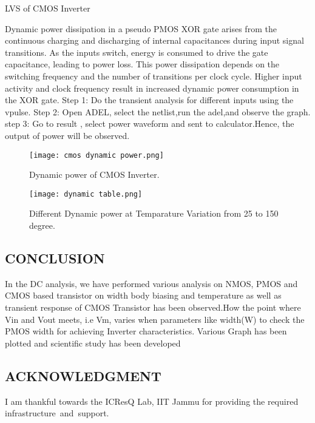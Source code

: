 \documentclass[conference]{IEEEtran}
\begin{document}
\begin{section}{LVS of CMOS Inverter}
\begin{Dynamic Power Analysis}
Dynamic power dissipation in a pseudo PMOS XOR gate
arises from the continuous charging and discharging of internal
capacitances during input signal transitions. As the inputs
switch, energy is consumed to drive the gate capacitance,
leading to power loss.
This power dissipation depends on the switching frequency
and the number of transitions per clock cycle. Higher input
activity and clock frequency result in increased dynamic power
consumption in the XOR gate.
Step 1: Do the transient analysis for different inputs using
the vpulse.
Step 2: Open ADEL, select the netlist,run the adel,and observe
the graph.
step 3: Go to result , select power waveform and sent to
calculator.Hence, the output of power will be observed.
 
\begin{figure}[h] %
    \centering
    \texttt{[image: cmos dynamic power.png]} %
    \caption{Dynamic power of CMOS Inverter.} %
     
\end{figure} 
 
 
\begin{figure}[h] %
    \centering
    \texttt{[image: dynamic table.png]} %
    \caption{Different Dynamic power at Temparature Variation from 25 to 150 degree.} %
     
\end{figure}  
 
 
 
 
 
 
 \section{CONCLUSION} 
In the  DC analysis, we have performed various analysis on NMOS, PMOS and CMOS based transistor on width body biasing and temperature as well as transient response of CMOS Transistor has been observed.How the point where Vin and Vout meets, i.e Vm, varies when parameters like width(W) to check the PMOS width for achieving Inverter characteristics. Various Graph has been plotted and scientific study has been developed
\section{ACKNOWLEDGMENT}
I am thankful towards the ICResQ Lab, IIT Jammu for
providing the required infrastructure and support.



\end{Dynamic Power Analysis}
\end{section}
\end{document}
